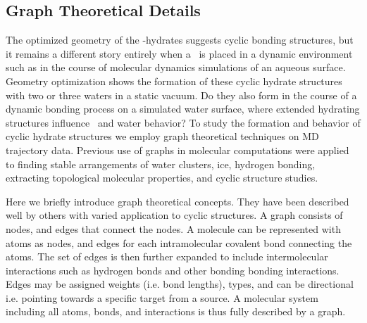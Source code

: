 \subsection {Graph Theoretical Details}
The optimized geometry of the \suldiox-hydrates suggests cyclic bonding structures, but it remains a different story entirely when a \suldiox~is placed in a dynamic environment such as in the course of molecular dynamics simulations of an aqueous surface. Geometry optimization shows the formation of these cyclic hydrate structures with two or three waters in a static vacuum. Do they also form in the course of a dynamic bonding process on a simulated water surface, where extended hydrating structures influence \suldiox~and water behavior? To study the formation and behavior of cyclic hydrate structures we employ graph theoretical techniques on MD trajectory data. Previous use of graphs in molecular computations were applied to finding stable arrangements of water clusters, ice, hydrogen bonding, extracting topological molecular properties, and cyclic structure studies.\cite{Anick2002, Huber2007, Radhakrishnan1991, Shi2005, Garcia2004, McDonald1998}

Here we briefly introduce graph theoretical concepts. They have been described well by others with varied application to cyclic structures.\cite{Tutte1984, Balakrishnan2000, Harary1973, Huber2007, Garcia2004, Dury2001} A graph consists of nodes, and edges that connect the nodes. A molecule can be represented with atoms as nodes, and edges for each intramolecular covalent bond connecting the atoms. The set of edges is then further expanded to include intermolecular interactions such as hydrogen bonds and other bonding bonding interactions. Edges may be assigned weights (i.e. bond lengths), types, and can be directional i.e. pointing towards a specific target from a source. A molecular system including all atoms, bonds, and interactions is thus fully described by a graph. 

